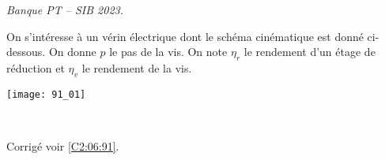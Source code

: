 \normaltrue \difficilefalse \tdifficilefalse
\correctionfalse


\textit{Banque PT -- SIB 2023.}
\setcounter{question}{0}
\ifcorrection
\else
{}
\fi

\ifprof
\else
On s’intéresse à un vérin électrique dont le schéma cinématique est donné ci-dessous. On donne $p$ le pas de la vis. On note $\eta_r$ le rendement d'un étage de réduction et $\eta_v$ le rendement de la vis.
\begin{center}
\texttt{[image: 91\_01]}
\end{center}


\fi


\ifprof
\else
\fi

\ifprof ~\\

\else
\fi


\ifprof
\else
\begin{flushright}
\footnotesize{Corrigé  voir \ref{C2:06:91}.}
\end{flushright}%
\fi
